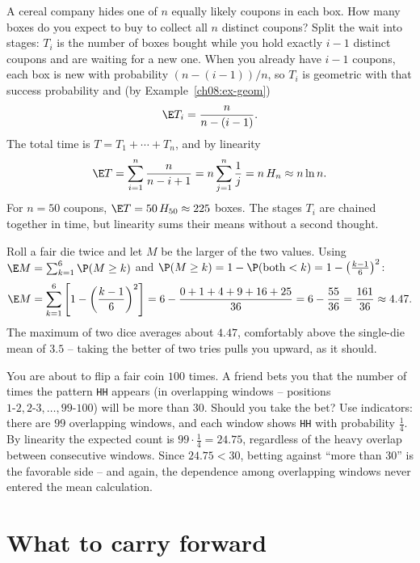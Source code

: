 \begin{example}
\label{ch08:ex-coupon}
A cereal company hides one of $n$ equally likely coupons in each box. How many
boxes do you expect to buy to collect all $n$ distinct coupons? Split the wait
into stages: $T_i$ is the number of boxes bought while you hold exactly $i-1$
distinct coupons and are waiting for a new one. When you already have $i-1$
coupons, each box is new with probability $(n-(i-1))/n$, so $T_i$ is geometric
with that success probability and (by Example~\ref{ch08:ex-geom})
\[
  \E T_i = \frac{n}{n-(i-1)}.
\]
The total time is $T = T_1 + \cdots + T_n$, and by linearity
\[
  \E T = \sum_{i=1}^n \frac{n}{n-i+1} = n\sum_{j=1}^n \frac1j = n\,H_n \approx n\ln n.
\]
For $n=50$ coupons, $\E T = 50\,H_{50} \approx 225$ boxes. The stages $T_i$ are
chained together in time, but linearity sums their means without a second thought.
\end{example}

\begin{example}
\label{ch08:ex-max}
Roll a fair die twice and let $M$ be the larger of the two values. Using
$\E M = \sum_{k=1}^6 \P(M \ge k)$ and $\P(M \ge k) = 1 - \P(\text{both} < k) =
1 - \bigl(\tfrac{k-1}{6}\bigr)^2$:
\[
  \E M = \sum_{k=1}^{6}\left[1 - \left(\frac{k-1}{6}\right)^2\right]
       = 6 - \frac{0+1+4+9+16+25}{36} = 6 - \frac{55}{36} = \frac{161}{36} \approx 4.47.
\]
The maximum of two dice averages about $4.47$, comfortably above the single-die
mean of $3.5$ -- taking the better of two tries pulls you upward, as it should.
\end{example}

\begin{walkbox}
You are about to flip a fair coin $100$ times. A friend bets you that the number
of times the pattern \texttt{HH} appears (in overlapping windows -- positions
$1\text{-}2, 2\text{-}3, \dots, 99\text{-}100$) will be more than $30$. Should you
take the bet? Use indicators: there are $99$ overlapping windows, and each window
shows \texttt{HH} with probability $\tfrac14$. By linearity the expected count is
$99\cdot\tfrac14 = 24.75$, regardless of the heavy overlap between consecutive
windows. Since $24.75 < 30$, betting against ``more than $30$'' is the favorable
side -- and again, the dependence among overlapping windows never entered the
mean calculation.
\end{walkbox}

\section{What to carry forward}
\label{ch08:summary}

